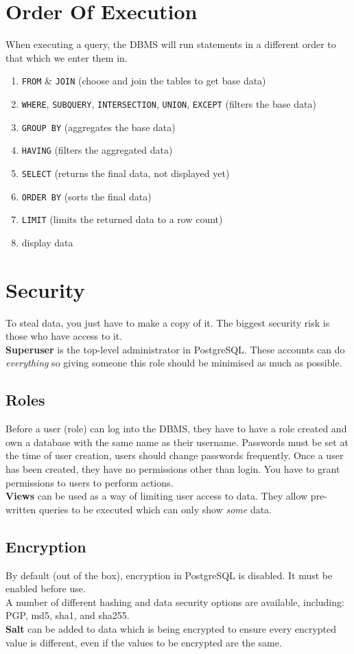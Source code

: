 \documentclass[a4paper,11pt]{article}
\begin{document}
\section{Order Of Execution}
When executing a query, the DBMS will run statements in a different order to that which we enter them in.
\begin{enumerate}
    \item \verb|FROM| \& \verb|JOIN| (choose and join the tables to get base data)
    \item \verb|WHERE|, \verb|SUBQUERY|, \verb|INTERSECTION|, \verb|UNION|, \verb|EXCEPT| (filters the base data)
    \item \verb|GROUP BY| (aggregates the base data)
    \item \verb|HAVING| (filters the aggregated data)
    \item \verb|SELECT| (returns the final data, not displayed yet)
    \item \verb|ORDER BY| (sorts the final data)
    \item \verb|LIMIT| (limits the returned data to a row count)
    \item display data
\end{enumerate}

\section{Security}
To steal data, you just have to make a copy of it. The biggest security risk is those who have access to it.\\
\textbf{Superuser} is the top-level administrator in PostgreSQL. These accounts can do \textit{everything} so giving someone this role should be minimised as much as possible.
\subsection{Roles}
Before a user (role) can log into the DBMS, they have to have a role created and own a database with the same name as their username. Passwords must be set at the time of user creation, users should change passwords frequently. Once a user has been created, they have no permissions other than login. You have to grant permissions to users to perform actions.\\
\textbf{Views} can be used as a way of limiting user access to data. They allow pre-written queries to be executed which can only show \textit{some} data.
\subsection{Encryption}
By default (out of the box), encryption in PostgreSQL is disabled. It must be enabled before use.\\
A number of different hashing and data security options are available, including: PGP, md5, sha1, and sha255.\\
\textbf{Salt} can be added to data which is being encrypted to ensure every encrypted value is different, even if the values to be encrypted are the same. 
\end{document}
